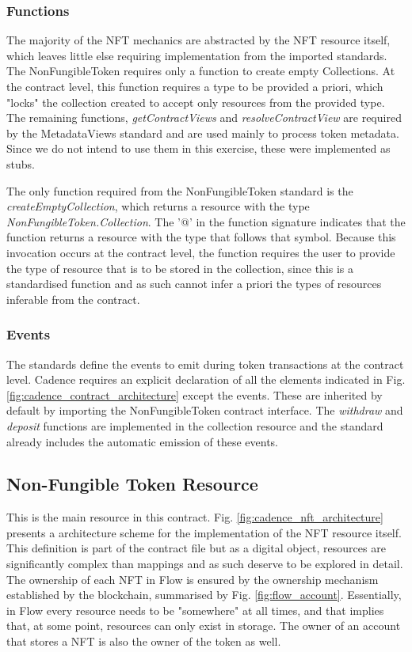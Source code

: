 \documentclass[../main.tex]{subfiles}
\begin{document}
\subsubsection{Functions}
\label{sec:flow_contract_functions}
The majority of the NFT mechanics are abstracted by the NFT resource itself, which leaves little else requiring implementation from the imported standards. The NonFungibleToken requires only a function to create empty Collections. At the contract level, this function requires a type to be provided a priori, which "locks" the collection created to accept only resources from the provided type. The remaining functions, \textit{getContractViews} and \textit{resolveContractView} are required by the MetadataViews standard and are used mainly to process token metadata. Since we do not intend to use them in this exercise, these were implemented as stubs.
\par
The only function required from the NonFungibleToken standard is the \textit{createEmptyCollection}, which returns a resource with the type \textit{NonFungibleToken.Collection}. The '@' in the function signature indicates that the function returns a resource with the type that follows that symbol. Because this invocation occurs at the contract level, the function requires the user to provide the type of resource that is to be stored in the collection, since this is a standardised function and as such cannot infer a priori the types of resources inferable from the contract.

\subsubsection{Events}
\label{sec:flow_contract_events}
The standards define the events to emit during token transactions at the contract level. Cadence requires an explicit declaration of all the elements indicated in Fig. \ref{fig:cadence_contract_architecture} except the events. These are inherited by default by importing the NonFungibleToken contract interface. The \textit{withdraw} and \textit{deposit} functions are implemented in the collection resource and the standard already includes the automatic emission of these events.


\subsection{Non-Fungible Token Resource}
This is the main resource in this contract. Fig. \ref{fig:cadence_nft_architecture} presents a architecture scheme for the implementation of the NFT resource itself. This definition is part of the contract file but as a digital object, resources are significantly complex than mappings and as such deserve to be explored in detail. The ownership of each NFT in Flow is ensured by the ownership mechanism established by the blockchain, summarised by Fig. \ref{fig:flow_account}. Essentially, in Flow every resource needs to be "somewhere" at all times, and that implies that, at some point, resources can only exist in storage. The owner of an account that stores a NFT is also the owner of the token as well.
\end{document}
